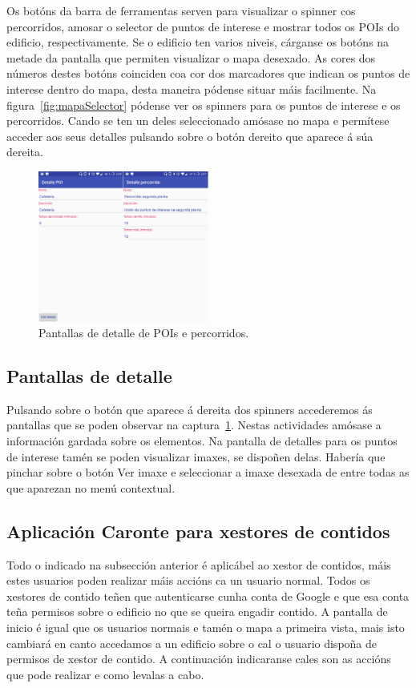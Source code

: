 Os botóns da barra de ferramentas serven para visualizar o spinner cos percorridos, amosar o selector de puntos de interese e mostrar todos os POIs do edificio, respectivamente. Se o edificio ten varios niveis, cárganse os botóns na metade da pantalla que permiten visualizar o mapa desexado. As cores dos números destes botóns coinciden coa cor dos marcadores que indican os puntos de interese dentro do mapa, desta maneira pódense situar máis facilmente. Na figura~\ref{fig:mapaSelector} pódense ver os spinners para os puntos de interese e os percorridos. Cando se ten un deles seleccionado amósase no mapa e permítese acceder aos seus detalles pulsando sobre o botón dereito que aparece á súa dereita.

\begin{figure}[h]
	\begin{center}
		\includegraphics[width=0.5\textwidth]{figures/android/detallePoiPercorrido}
		\caption{Pantallas de detalle de POIs e percorridos.}
		\label{fig:detallePoiPercorrido}
	\end{center}
\end{figure}

\subsection{Pantallas de detalle}
Pulsando sobre o botón que aparece á dereita dos spinners accederemos ás pantallas que se poden observar na captura~\ref{fig:detallePoiPercorrido}. Nestas actividades amósase a información gardada sobre os elementos. Na pantalla de detalles para os puntos de interese tamén se poden visualizar imaxes, se dispoñen delas. Habería que pinchar sobre o botón Ver imaxe e seleccionar a imaxe desexada de entre todas as que aparezan no menú contextual.


\subsection{Aplicación Caronte para xestores de contidos}
Todo o indicado na subsección anterior é aplicábel ao xestor de contidos, máis estes usuarios poden realizar máis accións ca un usuario normal. Todos os xestores de contido teñen que autenticarse cunha conta de Google e que esa conta teña permisos sobre o edificio no que se queira engadir contido. A pantalla de inicio é igual que os usuarios normais e tamén o mapa a primeira vista, mais isto cambiará en canto accedamos a un edificio sobre o cal o usuario dispoña de permisos de xestor de contido. A continuación indicaranse cales son as accións que pode realizar e como levalas a cabo.


